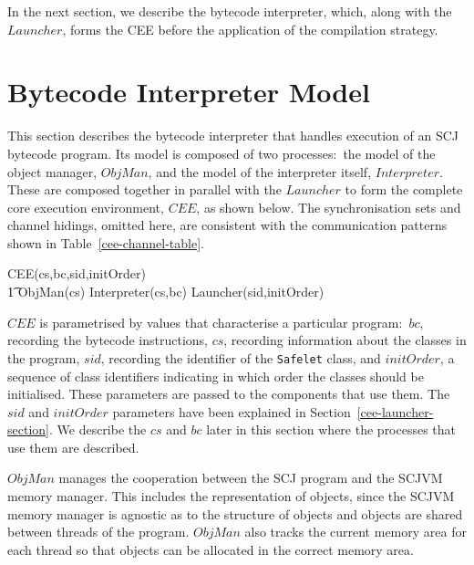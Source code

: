 

In the next section, we describe the bytecode interpreter, which,
along with the $Launcher$, forms the CEE before the application of the
compilation strategy.

% 

\section{Bytecode Interpreter Model}
\label{cee-interpreter-section}

This section describes the bytecode interpreter that handles execution
of an SCJ bytecode program.
Its model is composed of two processes:~the model of the object
manager, $ObjMan$, and the model of the interpreter itself,
$Interpreter$.
These are composed together in parallel with the $Launcher$ to form
the complete core execution environment, $CEE$, as shown below.
The synchronisation sets and channel hidings, omitted here, are
consistent with the communication patterns shown in
Table~\ref{cee-channel-table}.
\begin{circus}
  CEE(cs,bc,sid,initOrder) \circdef \\
  \t1 ObjMan(cs) \parallel Interpreter(cs,bc) \parallel Launcher(sid,initOrder)
\end{circus}
$CEE$ is parametrised by values that characterise a particular
program:~$bc$, recording the bytecode instructions, $cs$, recording
information about the classes in the program, $sid$, recording the
identifier of the \texttt{Safelet} class, and $initOrder$, a sequence
of class identifiers indicating in which order the classes should be
initialised.
These parameters are passed to the components that use them.
The $sid$ and $initOrder$ parameters have been explained in
Section~\ref{cee-launcher-section}. 
We describe the $cs$ and $bc$ later in this section where the
processes that use them are described.

$ObjMan$ manages the cooperation between the SCJ program and the SCJVM
memory manager.
This includes the representation of objects, since the SCJVM memory
manager is agnostic as to the structure of objects and objects are
shared between threads of the program.
$ObjMan$ also tracks the current memory area for each thread so that
objects can be allocated in the correct memory area.

